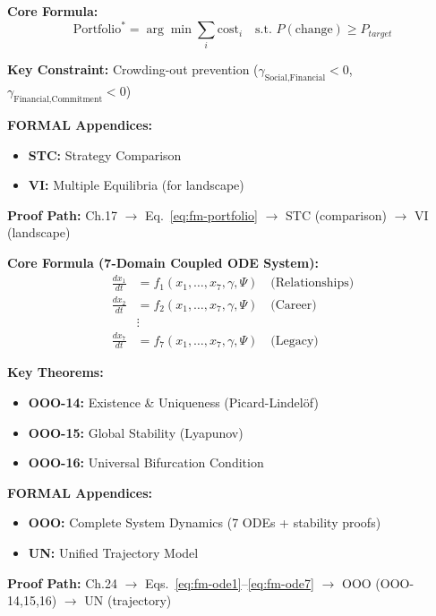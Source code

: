 \begin{tcolorbox}[colback=green!3!white, colframe=green!60!black,
    title=\textbf{Chapter 17: Intervention Design}]

\textbf{Core Formula:}
\begin{equation}
\text{Portfolio}^* = \arg\min \sum_i \text{cost}_i \quad \text{s.t. } P(\text{change}) \geq P_{target}
\label{eq:fm-portfolio}
\end{equation}

\textbf{Key Constraint:} Crowding-out prevention ($\gamma_{\text{Social,Financial}} < 0$, $\gamma_{\text{Financial,Commitment}} < 0$)

\textbf{FORMAL Appendices:}
\begin{itemize}[nosep]
    \item \textbf{STC:} Strategy Comparison
    \item \textbf{VI:} Multiple Equilibria (for landscape)
\end{itemize}

\textbf{Proof Path:} Ch.17 $\rightarrow$ Eq.~\ref{eq:fm-portfolio} $\rightarrow$ STC (comparison) $\rightarrow$ VI (landscape)

\end{tcolorbox}

\begin{tcolorbox}[colback=green!3!white, colframe=green!60!black,
    title=\textbf{Chapter 24: Emergent Life Journeys}]

\textbf{Core Formula (7-Domain Coupled ODE System):}
\begin{align}
\frac{dx_1}{dt} &= f_1(x_1, \ldots, x_7, \gamma, \Psi) \quad \text{(Relationships)} \label{eq:fm-ode1} \\
\frac{dx_2}{dt} &= f_2(x_1, \ldots, x_7, \gamma, \Psi) \quad \text{(Career)} \\
&\vdots \nonumber \\
\frac{dx_7}{dt} &= f_7(x_1, \ldots, x_7, \gamma, \Psi) \quad \text{(Legacy)} \label{eq:fm-ode7}
\end{align}

\textbf{Key Theorems:}
\begin{itemize}[nosep]
    \item \textbf{OOO-14:} Existence \& Uniqueness (Picard-Lindel\"{o}f)
    \item \textbf{OOO-15:} Global Stability (Lyapunov)
    \item \textbf{OOO-16:} Universal Bifurcation Condition
\end{itemize}

\textbf{FORMAL Appendices:}
\begin{itemize}[nosep]
    \item \textbf{OOO:} Complete System Dynamics (7 ODEs + stability proofs)
    \item \textbf{UN:} Unified Trajectory Model
\end{itemize}

\textbf{Proof Path:} Ch.24 $\rightarrow$ Eqs.~\ref{eq:fm-ode1}--\ref{eq:fm-ode7} $\rightarrow$ OOO (OOO-14,15,16) $\rightarrow$ UN (trajectory)

\end{tcolorbox}

